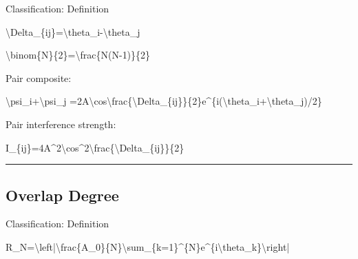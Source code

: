 \documentclass[
  a4paper,
]{article}
\newenvironment{Shaded}{}{}
\newcommand{\NormalTok}[1]{#1}
\begin{document}
Classification: Definition

\begin{Shaded}
\begin{Highlighting}[]
\NormalTok{\textbackslash{}Delta\_\{ij\}=\textbackslash{}theta\_i{-}\textbackslash{}theta\_j}
\end{Highlighting}
\end{Shaded}

\begin{Shaded}
\begin{Highlighting}[]
\NormalTok{\textbackslash{}binom\{N\}\{2\}=\textbackslash{}frac\{N(N{-}1)\}\{2\}}
\end{Highlighting}
\end{Shaded}

Pair composite:

\begin{Shaded}
\begin{Highlighting}[]
\NormalTok{\textbackslash{}psi\_i+\textbackslash{}psi\_j}
\NormalTok{=2A\textbackslash{}cos\textbackslash{}frac\{\textbackslash{}Delta\_\{ij\}\}\{2\}e\^{}\{i(\textbackslash{}theta\_i+\textbackslash{}theta\_j)/2\}}
\end{Highlighting}
\end{Shaded}

Pair interference strength:

\begin{Shaded}
\begin{Highlighting}[]
\NormalTok{I\_\{ij\}=4A\^{}2\textbackslash{}cos\^{}2\textbackslash{}frac\{\textbackslash{}Delta\_\{ij\}\}\{2\}}
\end{Highlighting}
\end{Shaded}

\begin{center}\rule{0.5\linewidth}{0.5pt}\end{center}

\subsection{Overlap Degree}\label{overlap-degree}

Classification: Definition

\begin{Shaded}
\begin{Highlighting}[]
\NormalTok{R\_N=\textbackslash{}left|\textbackslash{}frac\{A\_0\}\{N\}\textbackslash{}sum\_\{k=1\}\^{}\{N\}e\^{}\{i\textbackslash{}theta\_k\}\textbackslash{}right|}
\end{Highlighting}
\end{Shaded}
\end{document}
